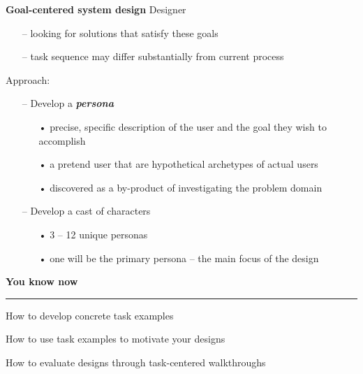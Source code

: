 \documentclass[pdf]{beamer}
\begin{document}
{\begin{frame} {\LARGE{\bf{\color{myBlue}\hspace{6mm}Goal-centered system design}}}
\hspace{1mm}
\Large Designer
	\begin{itemize}
    \color{myBlue}
	\item[\textcolor{myBlue}{--}] \normalsize looking for solutions that satisfy these goals
	\item[\textcolor{myBlue}{--}] \normalsize task sequence may differ substantially from current process
    \end{itemize}
\bigskip
\color{myBlue}
\hspace{1mm}
\Large Approach:
	\begin{itemize}
    \color{myBlue}
	\item[\textcolor{myBlue}{--}] \normalsize Develop a \textbf{\textit{persona}}
		\begin{itemize}
        \color{myBlue}
		\item[\textcolor{myBlue}{•}] precise, specific description of the user and the goal they wish to accomplish 
		\item[\textcolor{myBlue}{•}] a pretend  user that are hypothetical archetypes of actual users
		\item[\textcolor{myBlue}{•}] discovered as a by-product of investigating the problem domain
		\end{itemize}
    \medskip
    \color{myBlue}
	\item[\textcolor{myBlue}{--}] \normalsize Develop a cast of characters
		\begin{itemize}
        \color{myBlue}
		\item[\textcolor{myBlue}{•}] 3 – 12 unique personas
		\item[\textcolor{myBlue}{•}] one will be the primary persona – the main focus of the design
        \end{itemize}
    \end{itemize}
\end{frame}

\begin{frame} {\LARGE{\bf{\color{myBlue}\hspace{6mm}You know now}}}
\vspace*{-2mm}
{\textcolor{red}{\rule{11cm}{2.5pt}}}
\color{myBlue}

\hspace{3mm}
\Large How to develop concrete task examples \par
\bigskip
\hspace{3mm}
\Large How to use task examples to motivate your designs \par 
\bigskip
\hspace{3mm}
\Large How to evaluate designs through task-centered walkthroughs \par
\bigskip \bigskip \bigskip \bigskip \bigskip \bigskip \bigskip \bigskip
\end{frame}
}
\end{document}
